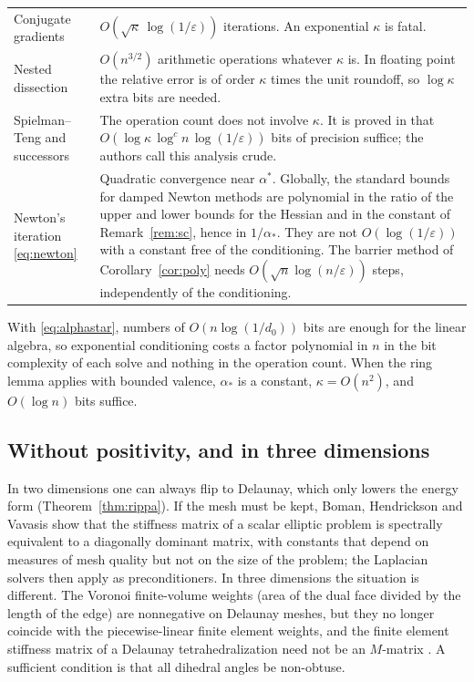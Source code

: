 \documentclass[11pt]{amsart}
\theoremstyle{definition}
\theoremstyle{remark}
\newcommand{\eps}{\varepsilon}
\begin{document}
\medskip
\begin{center}
\small
\begin{tabular}{@{}p{}p{}@{}}
\toprule
Conjugate gradients & $O(\sqrt\kappa\,\log(1/\eps))$ iterations. An exponential $\kappa$ is fatal.\\
Nested dissection & $O(n^{3/2})$ arithmetic operations whatever $\kappa$ is. In floating point the relative error is of order $\kappa$ times the unit roundoff, so $\log\kappa$ extra bits are needed.\\
Spielman--Teng and successors & The operation count does not involve $\kappa$. It is proved in \cite[Section~6]{STsolve} that $O(\log\kappa\,\log^cn\,\log(1/\eps))$ bits of precision suffice; the authors call this analysis crude.\\
Newton's iteration \eqref{eq:newton} & Quadratic convergence near $\alpha^*$. Globally, the standard bounds for damped Newton methods are polynomial in the ratio of the upper and lower bounds for the Hessian and in the constant of Remark~\ref{rem:sc}, hence in $1/\alpha_*$. They are not $O(\log(1/\eps))$ with a constant free of the conditioning. The barrier method of Corollary~\ref{cor:poly} needs $O(\sqrt n\log(n/\eps))$ steps, independently of the conditioning.\\
\bottomrule
\end{tabular}
\end{center}
\medskip

\noindent With \eqref{eq:alphastar}, numbers of $O(n\log(1/d_0))$ bits are enough for the linear algebra, so exponential conditioning costs a factor polynomial in $n$ in the bit complexity of each solve and nothing in the operation count. When the ring lemma applies with bounded valence, $\alpha_*$ is a constant, $\kappa=O(n^2)$, and $O(\log n)$ bits suffice.


\subsection{Without positivity, and in three dimensions}
In two dimensions one can always flip to Delaunay, which only lowers the energy form (Theorem~\ref{thm:rippa}). If the mesh must be kept, Boman, Hendrickson and Vavasis \cite{BHV08} show that the stiffness matrix of a scalar elliptic problem is spectrally equivalent to a
diagonally dominant matrix, with constants that depend on measures of mesh quality but not on the size of the problem; the Laplacian solvers then apply as preconditioners.
In three dimensions the situation is different. The Voronoi finite-volume weights (area of the dual face divided by the length of the edge) are nonnegative on Delaunay meshes, but they no longer coincide with the piecewise-linear finite element weights, and the finite element stiffness matrix of a Delaunay
tetrahedralization need not be an $M$-matrix \cite{PC98}. A sufficient condition is that all dihedral angles be non-obtuse.
\end{document}

